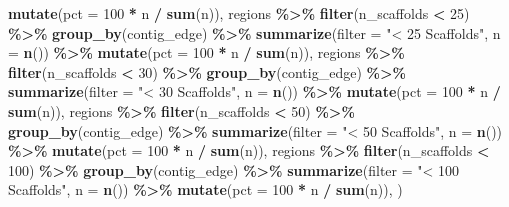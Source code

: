 \documentclass[
]{article}
\newenvironment{Shaded}{\begin{snugshade}}{\end{snugshade}}
\newcommand{\AttributeTok}[1]{\textcolor[rgb]{0.13,0.29,0.53}{#1}}
\newcommand{\DecValTok}[1]{\textcolor[rgb]{0.00,0.00,0.81}{#1}}
\newcommand{\FunctionTok}[1]{\textcolor[rgb]{0.13,0.29,0.53}{\textbf{#1}}}
\newcommand{\NormalTok}[1]{#1}
\newcommand{\SpecialCharTok}[1]{\textcolor[rgb]{0.81,0.36,0.00}{\textbf{#1}}}
\newcommand{\StringTok}[1]{\textcolor[rgb]{0.31,0.60,0.02}{#1}}
\begin{document}
\begin{Shaded}
\begin{Highlighting}[]
    \FunctionTok{mutate}\NormalTok{(}\AttributeTok{pct =} \DecValTok{100} \SpecialCharTok{*}\NormalTok{ n }\SpecialCharTok{/} \FunctionTok{sum}\NormalTok{(n)),}
\NormalTok{  regions }\SpecialCharTok{\%\textgreater{}\%}
    \FunctionTok{filter}\NormalTok{(n\_scaffolds }\SpecialCharTok{\textless{}} \DecValTok{25}\NormalTok{) }\SpecialCharTok{\%\textgreater{}\%}
    \FunctionTok{group\_by}\NormalTok{(contig\_edge) }\SpecialCharTok{\%\textgreater{}\%}
    \FunctionTok{summarize}\NormalTok{(}\AttributeTok{filter =} \StringTok{"\textless{} 25 Scaffolds"}\NormalTok{, }\AttributeTok{n =} \FunctionTok{n}\NormalTok{()) }\SpecialCharTok{\%\textgreater{}\%}
    \FunctionTok{mutate}\NormalTok{(}\AttributeTok{pct =} \DecValTok{100} \SpecialCharTok{*}\NormalTok{ n }\SpecialCharTok{/} \FunctionTok{sum}\NormalTok{(n)),}
\NormalTok{  regions }\SpecialCharTok{\%\textgreater{}\%}
    \FunctionTok{filter}\NormalTok{(n\_scaffolds }\SpecialCharTok{\textless{}} \DecValTok{30}\NormalTok{) }\SpecialCharTok{\%\textgreater{}\%}
    \FunctionTok{group\_by}\NormalTok{(contig\_edge) }\SpecialCharTok{\%\textgreater{}\%}
    \FunctionTok{summarize}\NormalTok{(}\AttributeTok{filter =} \StringTok{"\textless{} 30 Scaffolds"}\NormalTok{, }\AttributeTok{n =} \FunctionTok{n}\NormalTok{()) }\SpecialCharTok{\%\textgreater{}\%}
    \FunctionTok{mutate}\NormalTok{(}\AttributeTok{pct =} \DecValTok{100} \SpecialCharTok{*}\NormalTok{ n }\SpecialCharTok{/} \FunctionTok{sum}\NormalTok{(n)),}
\NormalTok{  regions }\SpecialCharTok{\%\textgreater{}\%}
    \FunctionTok{filter}\NormalTok{(n\_scaffolds }\SpecialCharTok{\textless{}} \DecValTok{50}\NormalTok{) }\SpecialCharTok{\%\textgreater{}\%}
    \FunctionTok{group\_by}\NormalTok{(contig\_edge) }\SpecialCharTok{\%\textgreater{}\%}
    \FunctionTok{summarize}\NormalTok{(}\AttributeTok{filter =} \StringTok{"\textless{} 50 Scaffolds"}\NormalTok{, }\AttributeTok{n =} \FunctionTok{n}\NormalTok{()) }\SpecialCharTok{\%\textgreater{}\%}
    \FunctionTok{mutate}\NormalTok{(}\AttributeTok{pct =} \DecValTok{100} \SpecialCharTok{*}\NormalTok{ n }\SpecialCharTok{/} \FunctionTok{sum}\NormalTok{(n)),}
\NormalTok{  regions }\SpecialCharTok{\%\textgreater{}\%}
    \FunctionTok{filter}\NormalTok{(n\_scaffolds }\SpecialCharTok{\textless{}} \DecValTok{100}\NormalTok{) }\SpecialCharTok{\%\textgreater{}\%}
    \FunctionTok{group\_by}\NormalTok{(contig\_edge) }\SpecialCharTok{\%\textgreater{}\%}
    \FunctionTok{summarize}\NormalTok{(}\AttributeTok{filter =} \StringTok{"\textless{} 100 Scaffolds"}\NormalTok{, }\AttributeTok{n =} \FunctionTok{n}\NormalTok{()) }\SpecialCharTok{\%\textgreater{}\%}
    \FunctionTok{mutate}\NormalTok{(}\AttributeTok{pct =} \DecValTok{100} \SpecialCharTok{*}\NormalTok{ n }\SpecialCharTok{/} \FunctionTok{sum}\NormalTok{(n)),}
\NormalTok{)}


\end{Highlighting}
\end{Shaded}
\end{document}
